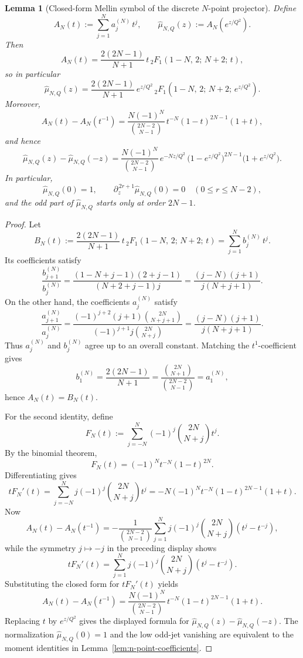 \documentclass[11pt,a4paper]{amsart}
\theoremstyle{plain}
\newtheorem{lemma}[theorem]{Lemma}
\theoremstyle{definition}
\begin{document}
\begin{lemma}[Closed-form Mellin symbol of the discrete $N$-point projector]
\label{lem:n-point-mellin-symbol}
Define
\[
A_N(t):=\sum_{j=1}^N a_j^{(N)}\,t^j,
\qquad
\widehat\mu_{N,Q}(z):=A_N(e^{z/Q^2}).
\]
Then
\[
A_N(t)
=
\frac{2(2N-1)}{N+1}\,
t\,{}_2F_1(1-N,\,2;\,N+2;\,t),
\]
so in particular
\[
\widehat\mu_{N,Q}(z)
=
\frac{2(2N-1)}{N+1}\,
e^{z/Q^2}\,
{}_2F_1(1-N,\,2;\,N+2;\,e^{z/Q^2}).
\]
Moreover,
\[
A_N(t)-A_N(t^{-1})
=
\frac{N(-1)^N}{\binom{2N-2}{N-1}}\,
t^{-N}(1-t)^{2N-1}(1+t),
\]
and hence
\[
\widehat\mu_{N,Q}(z)-\widehat\mu_{N,Q}(-z)
=
\frac{N(-1)^N}{\binom{2N-2}{N-1}}\,
e^{-Nz/Q^2}\,
\bigl(1-e^{z/Q^2}\bigr)^{2N-1}
\bigl(1+e^{z/Q^2}\bigr).
\]
In particular,
\[
\widehat\mu_{N,Q}(0)=1,
\qquad
\partial_z^{\,2r+1}\widehat\mu_{N,Q}(0)=0
\quad (0\le r\le N-2),
\]
and the odd part of $\widehat\mu_{N,Q}$ starts only at order $2N-1$.
\end{lemma}

\begin{proof}
Let
\[
B_N(t):=
\frac{2(2N-1)}{N+1}\,
t\,{}_2F_1(1-N,\,2;\,N+2;\,t)
=
\sum_{j=1}^N b_j^{(N)}\,t^j.
\]
Its coefficients satisfy
\[
\frac{b_{j+1}^{(N)}}{b_j^{(N)}}
=
\frac{(1-N+j-1)(2+j-1)}{(N+2+j-1)j}
=
\frac{(j-N)(j+1)}{j(N+j+1)}.
\]
On the other hand, the coefficients $a_j^{(N)}$ satisfy
\[
\frac{a_{j+1}^{(N)}}{a_j^{(N)}}
=
\frac{(-1)^{j+2}(j+1)\binom{2N}{N+j+1}}
     {(-1)^{j+1}j\binom{2N}{N+j}}
=
\frac{(j-N)(j+1)}{j(N+j+1)}.
\]
Thus $a_j^{(N)}$ and $b_j^{(N)}$ agree up to an overall constant.  Matching
the $t^1$-coefficient gives
\[
b_1^{(N)}
=
\frac{2(2N-1)}{N+1}
=
\frac{\binom{2N}{N+1}}{\binom{2N-2}{N-1}}
=
a_1^{(N)},
\]
hence $A_N(t)=B_N(t)$.

For the second identity, define
\[
F_N(t):=\sum_{j=-N}^{N}(-1)^j\binom{2N}{N+j}t^j.
\]
By the binomial theorem,
\[
F_N(t)=(-1)^N t^{-N}(1-t)^{2N}.
\]
Differentiating gives
\[
tF_N'(t)
=
\sum_{j=-N}^{N}j(-1)^j\binom{2N}{N+j}t^j
=
-N(-1)^N t^{-N}(1-t)^{2N-1}(1+t).
\]
Now
\[
A_N(t)-A_N(t^{-1})
=
-\frac{1}{\binom{2N-2}{N-1}}
\sum_{j=1}^N j(-1)^j\binom{2N}{N+j}(t^j-t^{-j}),
\]
while the symmetry $j\mapsto -j$ in the preceding display shows
\[
tF_N'(t)
=
\sum_{j=1}^N j(-1)^j\binom{2N}{N+j}(t^j-t^{-j}).
\]
Substituting the closed form for $tF_N'(t)$ yields
\[
A_N(t)-A_N(t^{-1})
=
\frac{N(-1)^N}{\binom{2N-2}{N-1}}\,
t^{-N}(1-t)^{2N-1}(1+t).
\]
Replacing $t$ by $e^{z/Q^2}$ gives the displayed formula for
$\widehat\mu_{N,Q}(z)-\widehat\mu_{N,Q}(-z)$.  The normalization
$\widehat\mu_{N,Q}(0)=1$ and the low odd-jet vanishing are equivalent to the
moment identities in Lemma~\ref{lem:n-point-coefficients}.
\end{proof}
\end{document}
